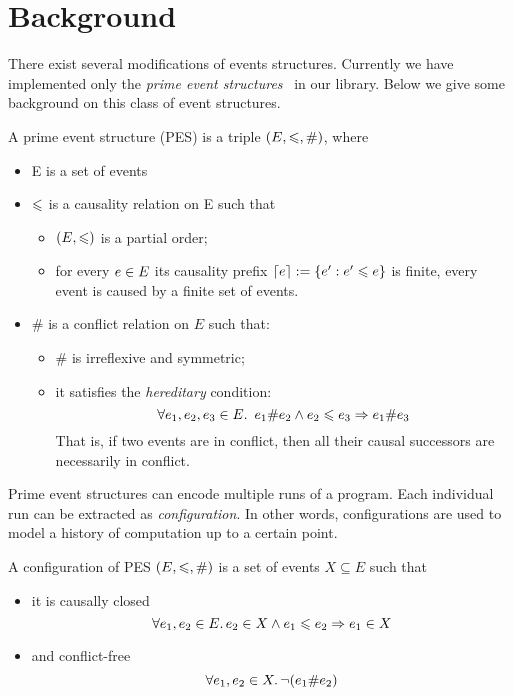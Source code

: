 \section{Background}

There exist several modifications of events structures.
Currently we have implemented only 
the \emph{prime event structures}~\cite{Winskel:86} in our library. 
Below we give some background on this class of event structures. 

\begin{definition} 
\label{es_def}
A prime event structure (PES) is a triple $(E, \leqslant, \#)$, where
\begin{itemize}
  \item E is a set of events
  \item $\leqslant$ is a causality relation on E such that 
  \begin{itemize}
    \item $ (E, \leqslant) $ is a partial order;
    \item for every $e \in E$ its causality prefix ${\lceil e \rceil := \{ e' : e' \leqslant e \}}$ 
      is finite, \ie every event is caused by a finite set of events.
  \end{itemize}
  \item $\#$ is a conflict relation on $E$ such that:
  \begin{itemize}
    \item $\#$ is irreflexive and symmetric;
    \item it satisfies the \emph{hereditary} condition:
    $$ \forall e_1, e_2, e_3 \in E \ldotp \ e_1 \# e_2 \land e_2 \leqslant e_3 \Rightarrow e_1 \# e_3 $$
      That is, if two events are in conflict, then all their causal successors 
      are necessarily in conflict.
  \end{itemize}
\end{itemize}
\end{definition}

Prime event structures can encode multiple runs of a program.
Each individual run can be extracted as \emph{configuration}. 
In other words, configurations are used to model 
a history of computation up to a certain point.

\begin{definition}
A configuration of PES $(E, \leqslant, \#)$ is a set of events $X \subseteq E$ such that
\begin{itemize}
  \item it is causally closed 
    $$ \forall e_1, e_2 \in E \ldotp e_2 \in X \land e_1 \leqslant e_2 \Rightarrow e_1 \in X $$
  \item and conflict-free 
    $$ \forall e_1, e_2 \in X \ldotp \neg (e_1 \# e_2) $$
\end{itemize}
\end{definition}

